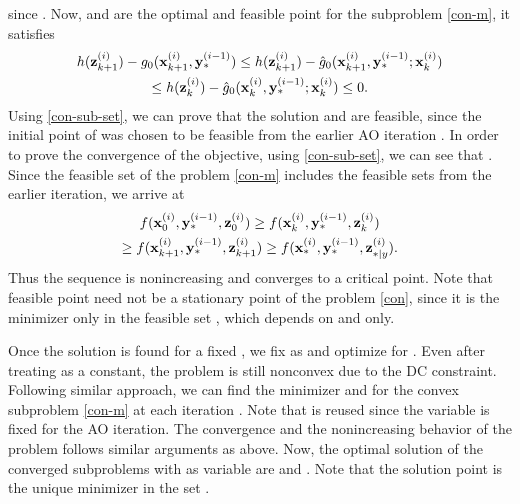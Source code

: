 since . Now,  and  are the optimal and feasible point for the  subproblem \eqref{con-m}, it satisfies
\begin{multline}\label{con-sub-set}
h(\iter{\mz}{k+1}{i}) - {g}_0(\iter{\mx}{k+1}{i},\iter{\my}{\ast}{i-1}) \leq h(\iter{\mz}{k+1}{i}) - \hat{g}_0(\iter{\mx}{k+1}{i},\iter{\my}{\ast}{i-1};\iter{\mx}{k}{i}) \\
\leq h(\iter{\mz}{k}{i}) - \hat{g}_0(\iter{\mx}{k}{i},\iter{\my}{\ast}{i-1};\iter{\mx}{k}{i}) \leq 0. 
\end{multline}
Using \eqref{con-sub-set}, we can prove that the solution  and  are feasible, since the initial point of  was chosen to be feasible from the earlier \ac{AO} iteration . In order to prove the convergence of the objective, using \eqref{con-sub-set}, we can see that . Since the feasible set of the problem \eqref{con-m} includes the feasible sets from the earlier iteration, we arrive at
\begin{multline} \label{con-convergence}
f(\iter{\mx}{0}{i},\iter{\my}{\ast}{i-1},\iter{\mz}{0}{i}) \geq f(\iter{\mx}{k}{i},\iter{\my}{\ast}{i-1},\iter{\mz}{k}{i}) \\ \geq f(\iter{\mx}{k+1}{i},\iter{\my}{\ast}{i-1},\iter{\mz}{k+1}{i}) \geq f(\iter{\mx}{\ast}{i},\iter{\my}{\ast}{i-1},\iter{\mz}{\ast|y}{i}). 
\end{multline}
Thus the sequence  is nonincreasing and converges to a critical point. Note that feasible point  need not be a stationary point of the problem \eqref{con}, since it is the minimizer only in the feasible set , which depends on \me{\mx} and \me{\mz} only.

Once the solution is found for a fixed \me{\my}, we fix \me{\mx} as  and optimize for \me{\my}. Even after treating \me{\mx} as a constant, the problem is still nonconvex due to the \ac{DC} constraint. Following similar approach, we can find the minimizer  and  for the convex subproblem \eqref{con-m} at each iteration . Note that  is reused since the variable \me{\mx} is fixed for the  \ac{AO} iteration. The convergence and the nonincreasing behavior of the problem follows similar arguments as above. Now, the optimal solution of the converged subproblems with \me{\my} as variable are  and . Note that the solution point  is the unique minimizer in the set .

